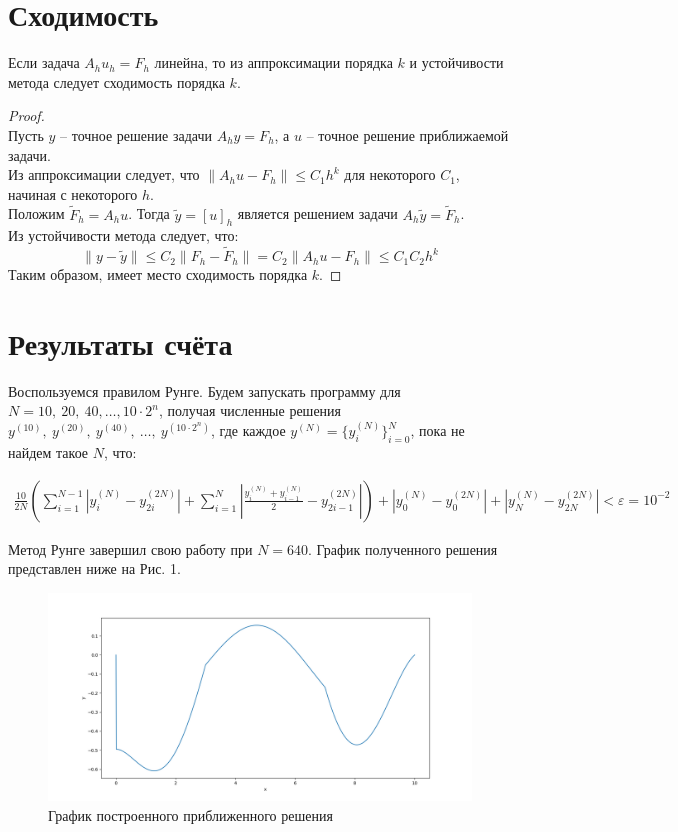 \documentclass[titlepage]{article}
\def\l{\left}
\def\r{\right}
\def\le{\leqslant}
\begin{document}
\section{Сходимость}
\begin{theorem}
	Если задача $A_h u_h = F_h$ линейна, то из аппроксимации порядка $k$ и устойчивости метода следует сходимость порядка $k$.
\end{theorem}
\begin{proof}
\hfill \\
Пусть $y$ -- точное решение задачи $A_hy = F_h$, а $u$ -- точное решение приближаемой задачи. \\
Из аппроксимации следует, что $\|A_hu - F_h\| \le C_1h^k$ для некоторого $C_1$, начиная с некоторого $h$. \\
Положим $\tilde F_h = A_h u$. Тогда $\tilde y = [u]_h$ является решением задачи $A_h \tilde y = \tilde F_h$. \\
Из устойчивости метода следует, что:
$$\| y - \tilde y \| \le C_2 \| F_h - \tilde F_h \| = C_2 \| A_h u - F_h \| \le C_1 C_2 h^k$$ 
Таким образом, имеет место сходимость порядка $k$.
\end{proof}

\section{Результаты счёта}
Воспользуемся правилом Рунге. Будем запускать программу для $N = 10,\ 20,\ 40,\dots,10\cdot2^n$, получая численные решения $y^{(10)},\ y^{(20)},\  y^{(40)},\ \dots ,\  y^{(10\cdot2^n)}$, где каждое $y^{(N)} = \{y_i^{(N)}\}_{i=0}^{N}$, пока не найдем такое $N$, что:

\begin{gather*}
	\frac{10}{2N} \l( \sum_{i=1}^{N-1}{\l| y_i^{(N)} - y_{2i}^{(2N)} \r|} + \sum_{i=1}^{N}{ \l| \frac{y_i^{(N)} + y_{i-1}^{(N)}}{2}  - y_{2i-1}^{(2N)} \r|} \r) + \l|y_0^{(N)} - y_{0}^{(2N)}\r| + \l|y_N^{(N)} - y_{2N}^{(2N)}\r| < \varepsilon = 10^{-2}
\end{gather*}

Метод Рунге завершил свою работу при $N = 640$. График полученного решения представлен ниже на Рис. 1.

\begin{figure}[h]
\includegraphics[width=150mm]{Figure_1.png}		
	\caption{График построенного приближенного решения}
\end{figure}
	
\end{document}
